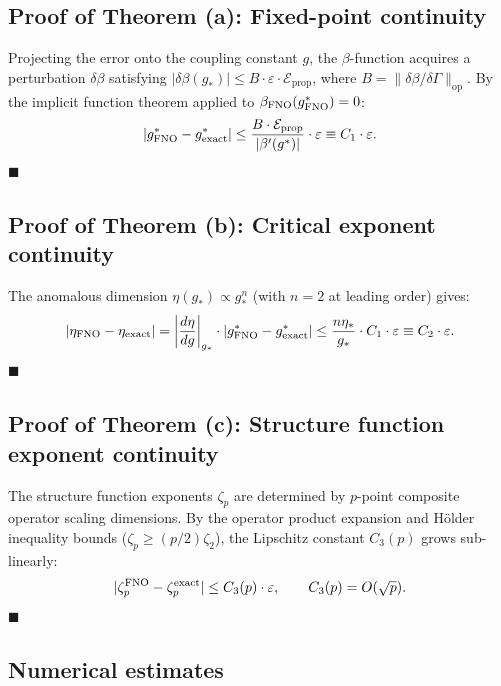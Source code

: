 \subsection{Proof of Theorem (a): Fixed-point continuity}

Projecting the error onto the coupling constant $g$, the $\beta$-function acquires a perturbation $\delta\beta$ satisfying $|\delta\beta(g_*)| \leq B\cdot\varepsilon\cdot\mathcal{E}_{\mathrm{prop}}$, where $B = \|\delta\beta/\delta\Gamma\|_{\mathrm{op}}$. By the implicit function theorem applied to $\beta_{\text{FNO}}(g^*_{\text{FNO}}) = 0$:
\begin{equation}
|g^*_{\text{FNO}} - g^*_{\mathrm{exact}}| \leq \frac{B\cdot\mathcal{E}_{\mathrm{prop}}}{|\beta'(g^*)|}\cdot\varepsilon \equiv C_1\cdot\varepsilon.
\end{equation}
\hfill$\blacksquare$

\subsection{Proof of Theorem (b): Critical exponent continuity}

The anomalous dimension $\eta(g_*) \propto g_*^n$ (with $n=2$ at leading order) gives:
\begin{equation}
|\eta_{\text{FNO}} - \eta_{\mathrm{exact}}| = \left|\frac{d\eta}{dg}\right|_{g_*}\cdot|g^*_{\text{FNO}}-g^*_{\mathrm{exact}}| \leq \frac{n\eta_*}{g_*}\cdot C_1\cdot\varepsilon \equiv C_2\cdot\varepsilon.
\end{equation}
\hfill$\blacksquare$

\subsection{Proof of Theorem (c): Structure function exponent continuity}

The structure function exponents $\zeta_p$ are determined by $p$-point composite operator scaling dimensions. By the operator product expansion and H\"older inequality bounds ($\zeta_p \geq (p/2)\zeta_2$), the Lipschitz constant $C_3(p)$ grows sub-linearly:
\begin{equation}
|\zeta_p^{\text{FNO}} - \zeta_p^{\mathrm{exact}}| \leq C_3(p)\cdot\varepsilon, \qquad C_3(p) = O(\sqrt{p}).
\end{equation}
\hfill$\blacksquare$

\subsection{Numerical estimates}

